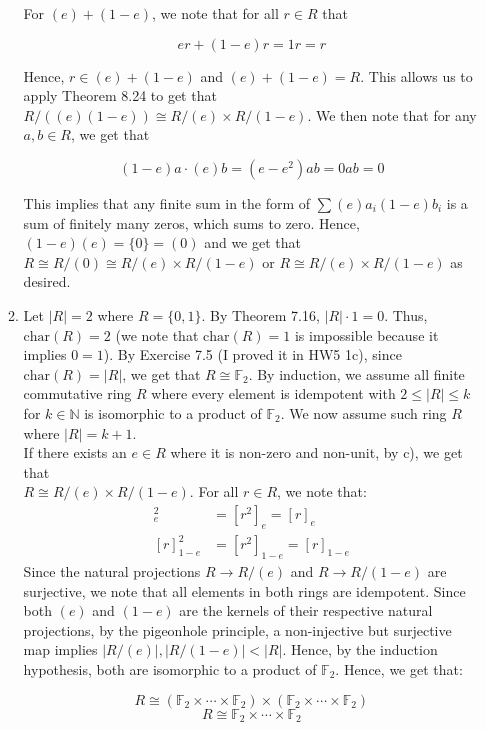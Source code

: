 \documentclass{article}
\begin{document}
\begin{enumerate}
\begin{enumerate}
   For $(e) + (1-e)$, we note that for all $r \in R$ that 
   
   $$er + (1-e)r = 1r = r$$
   
   Hence, $r \in (e) + (1 -e)$ and $(e) + (1 - e) = R$. This allows us to apply Theorem 8.24 to get that $R/((e)(1-e)) \cong R/(e) \times R/(1-e)$. We then note that for any $a, b \in R$, we get that 
   
   $$(1-e)a\cdot(e)b = (e-e^2)ab = 0ab = 0$$

   This implies that any finite sum in the form of $\sum (e)a_i(1-e)b_i$ is a sum of finitely many zeros, which sums to zero. Hence, $(1-e)(e) = \{0\} = (0)$ and we get that $R \cong R/(0) \cong R/(e) \times R/(1-e)$ or $R \cong R/(e) \times R/(1-e)$ as desired. \\

    \item 
    Let $|R| = 2$ where $R = \{0, 1\}$. By Theorem 7.16, $|R| \cdot 1 = 0$. Thus, $\text{char}(R) = 2$ (we note that $\text{char}(R) = 1$ is impossible because it implies $0 = 1$). By Exercise 7.5 (I proved it in HW5 1c), since $\text{char}(R) = |R|$, we get that $R \cong \mathbb{F}_2$. By induction, we assume all finite commutative ring $R$ where every element is idempotent with $2 \leq |R| \leq k$ for $k \in \mathbb{N}$ is isomorphic to a product of $\mathbb{F}_2$. We now assume such ring $R$ where $|R| = k + 1$. \\

    If there exists an $e \in R$ where it is non-zero and non-unit, by c), we get that \\
    $R \cong R/(e) \times R/(1-e)$. For all $r \in R$, we note that:
    \begin{align*}
        [r]_e^2 &= [r^2]_e = [r]_e \\
        [r]_{1-e}^2 &= [r^2]_{1-e} = [r]_{1-e}
    \end{align*}
    Since the natural projections $R \rightarrow R/(e)$ and $R \rightarrow R/(1-e)$ are surjective, we note that all elements in both rings are idempotent. Since both $(e)$ and $(1-e)$ are the kernels of their respective natural projections, by the pigeonhole principle, a non-injective but surjective map implies $|R/(e)|, |R/(1-e)| < |R|$. Hence, by the induction hypothesis, both are isomorphic to a product of $\mathbb{F}_2$. Hence, we get that: 

    $$R \cong (\mathbb{F}_2 \times \cdots \times \mathbb{F}_2 ) \times (\mathbb{F}_2 \times \cdots \times \mathbb{F}_2 ) $$
    $$R \cong \mathbb{F}_2 \times \cdots \times \mathbb{F}_2  $$


\end{enumerate}
\end{enumerate}
\end{document}
